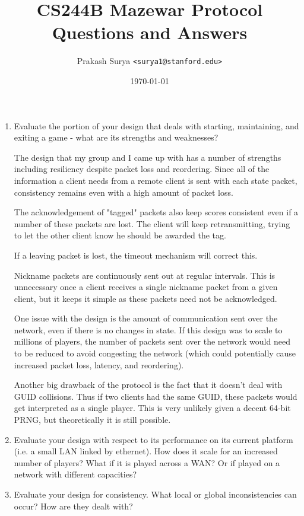 \documentclass{article}
\title{CS244B Mazewar Protocol Questions and Answers}
\author{Prakash Surya \texttt{<surya1@stanford.edu>}}
\date{\today}
\begin{document}
\maketitle

\begin{enumerate}

\item Evaluate the portion of your design that deals with starting,
maintaining, and exiting a game - what are its strengths and weaknesses?

The design that my group and I came up with has a number of strengths
including resiliency despite packet loss and reordering. Since all of
the information a client needs from a remote client is sent with each
state packet, consistency remains even with a high amount of packet
loss.

The acknowledgement of "tagged" packets also keep scores consistent even
if a number of these packets are lost. The client will keep
retransmitting, trying to let the other client know he should be awarded
the tag.

If a leaving packet is lost, the timeout mechanism will correct this.

Nickname packets are continuously sent out at regular intervals. This is
unnecessary once a client receives a single nickname packet from a given
client, but it keeps it simple as these packets need not be
acknowledged.

One issue with the design is the amount of communication sent over the
network, even if there is no changes in state. If this design was to
scale to millions of players, the number of packets sent over the
network would need to be reduced to avoid congesting the network (which
could potentially cause increased packet loss, latency, and reordering).

Another big drawback of the protocol is the fact that it doesn't deal
with GUID collisions. Thus if two clients had the same GUID, these
packets would get interpreted as a single player. This is very unlikely
given a decent 64-bit PRNG, but theoretically it is still possible.

\item Evaluate your design with respect to its performance on its current
platform (i.e. a small LAN linked by ethernet). How does it scale for an
increased number of players? What if it is played across a WAN? Or if
played on a network with different capacities?

\item Evaluate your design for consistency. What local or global
inconsistencies can occur? How are they dealt with?


\end{enumerate}
\end{document}
